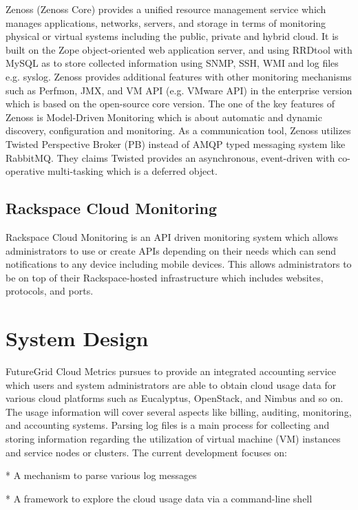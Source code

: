 \documentclass{sig-alternate}
\begin{document}
Zenoss (Zenoss Core) provides a unified resource management service which manages applications, networks, servers, and storage in terms of monitoring physical or virtual systems including the public, private and hybrid cloud. It is built on the Zope object-oriented web application server, and using RRDtool with MySQL as to store collected information using SNMP, SSH, WMI and log files e.g. syslog. Zenoss provides additional features with other monitoring mechanisms such as Perfmon, JMX, and VM API (e.g. VMware API) in the enterprise version which is based on the open-source core version. The one of the key features of Zenoss is Model-Driven Monitoring which is about automatic and dynamic discovery, configuration and monitoring. As a communication tool, Zenoss utilizes Twisted Perspective Broker (PB) instead of AMQP typed messaging system like RabbitMQ. They claims Twisted provides an asynchronous, event-driven with co-operative multi-tasking which is a deferred object.

\subsection{Rackspace Cloud Monitoring}

Rackspace Cloud Monitoring is an API driven monitoring system which allows administrators to use or create APIs depending on their needs which can send notifications to any device including mobile devices. This allows administrators to be on top of their Rackspace-hosted infrastructure which includes websites, protocols, and ports.

\section{System Design} \label{S:design}

FutureGrid Cloud Metrics pursues to provide an integrated accounting service which users and system administrators are able to obtain cloud usage data for various cloud platforms such as Eucalyptus, OpenStack, and Nimbus and so on. The usage information will cover several aspects like billing, auditing, monitoring, and accounting systems. Parsing log files is a main process for collecting and storing information regarding the utilization of virtual machine (VM) instances and service nodes or clusters. The current development focuses on:

* A mechanism to parse various log messages

* A framework to explore the cloud usage data via a command-line shell
\end{document}
